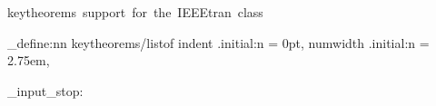   {keytheorems~support~for~the~IEEEtran~class}

\keys_define:nn { keytheorems/listof }
  {
    indent   .initial:n = 0pt,
    numwidth .initial:n = 2.75em,
  }
  
\file_input_stop: